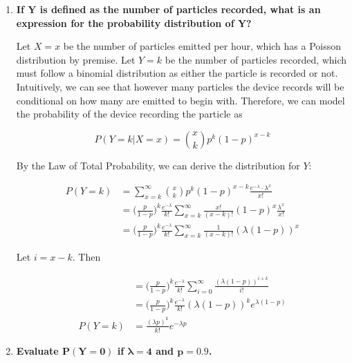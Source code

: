 \documentclass[10pt, oneside]{article}
\begin{document}
\begin{enumerate}[label=8.\arabic*]
	\begin{enumerate}
	\item  \begin{tcolorbox}[
	  colback=Cerulean!5!white,
	  colframe=Cerulean!75!black]
	\textbf{If $\bm{Y}$ is defined as the number of particles recorded, what is an expression for the probability distribution of $\bm{Y}$?}
	\end{tcolorbox}
	
	Let $X = x$ be the number of particles emitted per hour, which has a Poisson distribution by premise. Let $Y = k$ be the number of particles recorded, which must follow a binomial distribution as either the particle is recorded or not. Intuitively, we can see that however many particles the device records will be conditional on how many are emitted to begin with. Therefore, we can model the probability of the device recording the particle as
	
	\[ P(Y = k | X = x) = \binom{x}{k} p^k (1-p)^{x-k} \]
	
	By the Law of Total Probability, we can derive the distribution for $Y$:
	
	\begin{align*}
	P(Y = k) &= \sum^{\infty}_{x=k} \binom{x}{k} p^k (1-p)^{x-k} \frac{e^{-\lambda} \cdot \lambda^x}{x!} \\
	&= \Big( \frac{p}{1-p} \Big)^k \frac{e^{-\lambda}}{k!} \sum^{\infty}_{x=k} \frac{x!}{(x-k)!} (1-p)^x \frac{\lambda^x}{x!} \\
	&= \Big( \frac{p}{1-p} \Big)^k \frac{e^{-\lambda}}{k!} \sum^{\infty}_{x=k} \frac{1}{(x-k)!} (\lambda (1-p))^x
	\end{align*}
	
	Let $i = x - k$. Then
	
	\begin{align*}
	&= \Big( \frac{p}{1-p} \Big)^k \frac{e^{-\lambda}}{k!} \sum^{\infty}_{i=0} \frac{(\lambda (1-p))^{i + k}}{i!} \\
	&= \Big( \frac{p}{1-p} \Big)^k \frac{e^{-\lambda}}{k!} (\lambda (1-p))^k e^{\lambda (1-p)} \\
	P(Y = k) &= \boxed{ \frac{(\lambda p)^k}{k!} e^{-\lambda p} }
	\end{align*}
	
	\item  \begin{tcolorbox}[
	  colback=Cerulean!5!white,
	  colframe=Cerulean!75!black]
	\textbf{Evaluate $\bm{P(Y = 0)}$ if $\bm{\lambda = 4}$ and $\bm{p = 0.9}$.}
	\end{tcolorbox}
	

\end{enumerate}
\end{enumerate}
\end{document}
